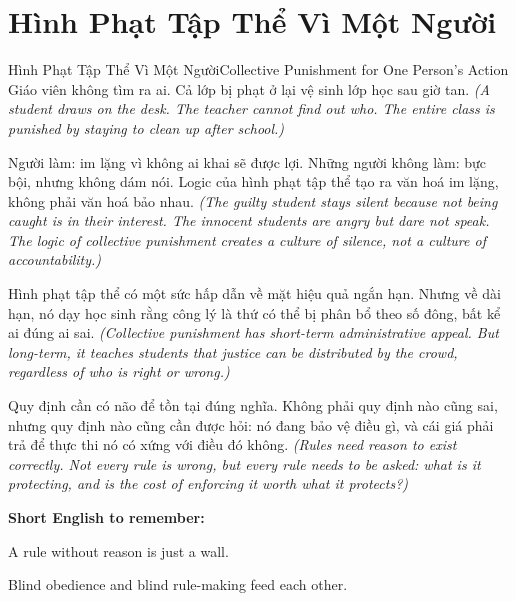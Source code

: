 \section{Hình Phạt Tập Thể Vì Một Người}
\begin{truyen}{Hình Phạt Tập Thể Vì Một Người}{Collective Punishment for One Person's Action}
 Giáo viên không tìm ra ai. Cả lớp bị phạt ở lại vệ sinh lớp học sau giờ tan.
\textit{(A student draws on the desk. The teacher cannot find out who. The entire class is punished by staying to clean up after school.)}



Người làm: im lặng vì không ai khai sẽ được lợi. Những người không làm: bực bội, nhưng không dám nói. Logic của hình phạt tập thể tạo ra văn hoá im lặng, không phải văn hoá bảo nhau.
\textit{(The guilty student stays silent because not being caught is in their interest. The innocent students are angry but dare not speak. The logic of collective punishment creates a culture of silence, not a culture of accountability.)}

\begin{baihoc}
Hình phạt tập thể có một sức hấp dẫn về mặt hiệu quả ngắn hạn. Nhưng về dài hạn, nó dạy học sinh rằng công lý là thứ có thể bị phân bổ theo số đông, bất kể ai đúng ai sai.
\textit{(Collective punishment has short-term administrative appeal. But long-term, it teaches students that justice can be distributed by the crowd, regardless of who is right or wrong.)}
\end{baihoc}
\end{truyen}

\begin{baihoc}
Quy định cần có não để tồn tại đúng nghĩa. Không phải quy định nào cũng sai, nhưng quy định nào cũng cần được hỏi: nó đang bảo vệ điều gì, và cái giá phải trả để thực thi nó có xứng với điều đó không.
\textit{(Rules need reason to exist correctly. Not every rule is wrong, but every rule needs to be asked: what is it protecting, and is the cost of enforcing it worth what it protects?)}
\end{baihoc}

\begin{ghinhoanh}
\textbf{Short English to remember:}

A rule without reason is just a wall.

Blind obedience and blind rule-making feed each other.
\end{ghinhoanh}

